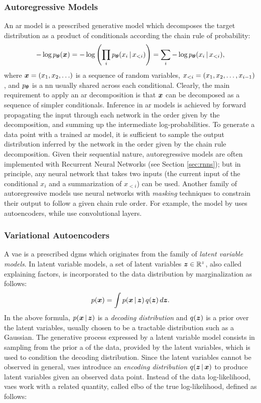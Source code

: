 \subsubsection*{Autoregressive Models}
An \gls{ar} model is a prescribed generative model which decomposes the target distribution as a product of conditionals according the chain rule of probability:
$$-\log p_{\Param}(\Vector{x}) = -\log\Par{\prod_i p_{\Param}(x_i \given x_{<i})} = \sum_i -\log p_{\Param}(x_i \given x_{<i}),$$
where $\Vector{x} = (x_1, x_2, \ldots)$ is a sequence of random variables, $x_{<i} = \left( x_1, x_2, \ldots, x_{i-1} \right)$, and $p_{\boldsymbol{\theta}}$ is a \gls{nn} usually shared across each conditional. Clearly, the main requirement to apply an \gls{ar} decomposition is that $\Vector{x}$ can be decomposed as a sequence of simpler conditionals. Inference in \gls{ar} models is achieved by forward propagating the input through each network in the order given by the decomposition, and summing up the intermediate log-probabilities. To generate a data point with a trained \gls{ar} model, it is sufficient to sample the output distribution inferred by the network in the order given by the chain rule decomposition. Given their sequential nature, autoregressive models are often implemented with Recurrent Neural Networks (see Section \ref{sec:rnns}); but in principle, any neural network that takes two inputs (the current input of the conditional $x_i$ and a summarization of $x_{<i}$) can be used. Another family of autoregressive models use neural networks with \emph{masking} techniques to constrain their output to follow a given chain rule order. For example, the model by \citet{germain2015made} uses autoencoders, while \citet{vandenoord2016wavenet} use convolutional layers.

\subsubsection*{Variational Autoencoders}
A \gls{vae} \citep{kingma2014vae} is a prescribed \glspl{dgm} which originates from the family of \emph{latent variable models}. In latent variable models, a set of latent variables $\Vector{z} \in \Real^z$, also called explaining factors, is incorporated to the data distribution by marginalization as follows:
$$p(\Vector{x}) = \int p(\Vector{x} \given \Vector{z})\, q(\Vector{z})\, d\Vector{z}.$$
In the above formula, $p(\Vector{x} \given \Vector{z})$ is a \emph{decoding distribution} and $q(\Vector{z})$ is a prior over the latent variables, usually chosen to be a tractable distribution such as a Gaussian. The generative process expressed by a latent variable model consists in sampling from the prior a  of the data, provided by the latent variables, which is used to condition the decoding distribution. Since the latent variables cannot be observed in general, \glspl{vae} introduce an \emph{encoding distribution} $q(\Vector{z} \given \Vector{x})$ to produce latent variables given an observed data point. Instead of the data log-likelihood, \glspl{vae} work with a related quantity, called \gls{elbo} of the true log-likelihood, defined as follows:

